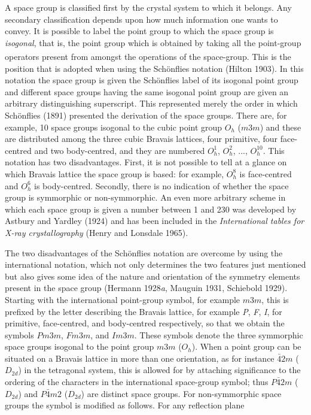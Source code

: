 \documentclass[11pt,a4paper,twoside,openright]{book}
\begin{document}
A space group is classified first by the crystal system to which it belongs. Any secondary classification depends upon how much information one wants to convey. It is possible to label the point group to which the space group is \textit{isogonal}, that is, the point group which is obtained by taking all the point-group operators present from amongst the operations of the space-group.\textsuperscript{\ddag} This is the position that is adopted when using the Schönflies notation (Hilton 1903). In this notation the space group is given the Schönflies label of its isogonal point group and different space groups having the same isogonal point group are given an arbitrary distinguishing superscript. This represented merely the order in which Schönflies (1891) presented the derivation of the space groups. There are, for example, 10 space groups isogonal to the cubic point group $O_{h}$ ($m3m$) and these are distributed among the three cubic Bravais lattices, four primitive, four face-centred and two body-centred, and they are numbered $O_{h}^{1}$, $O_{h}^{2}$, ..., $O_{h}^{10}$. This notation has two disadvantages. First, it is not possible to tell at a glance on which Bravais lattice the space group is based: for example, $O_{h}^{8}$ is face-centred and $O_{h}^{6}$ is body-centred. Secondly, there is no indication of whether the space group is symmorphic or non-symmorphic. An even more arbitrary scheme in which each space group is given a number between 1 and 230 was developed by Astbury and Yardley (1924) and has been included in the \textit{International tables for X-ray crystallography} (Henry and Lonsdale 1965).

The two disadvantages of the Schönflies notation are overcome by using the international notation, which not only determines the two features just mentioned but also gives some idea of the nature and orientation of the symmetry elements present in the space group (Hermann 1928\textit{a}, Mauguin 1931, Schiebold 1929). Starting with the international point-group symbol, for example $m3m$, this is prefixed by the letter describing the Bravais lattice, for example \textit{P}, \textit{F}, \textit{I}, for primitive, face-centred, and body-centred respectively, so that we obtain the symbols $Pm3m$, $Fm3m$, and $Im3m$. These symbols denote the three symmorphic space groups isogonal to the point group $m3m$ ($O_{h}$). When a point group can be situated on a Bravais lattice in more than one orientation, as for instance $\bar{4}2m$ ($D_{2d}$) in the tetragonal system, this is allowed for by attaching significance to the ordering of the characters in the international space-group symbol; thus $P\bar{4}2m$ ($D_{2d}$) and $P\bar{4}m2$ ($D_{2d}$) are distinct space groups. For non-symmorphic space groups the symbol is modified as follows. For any reflection plane
\end{document}
